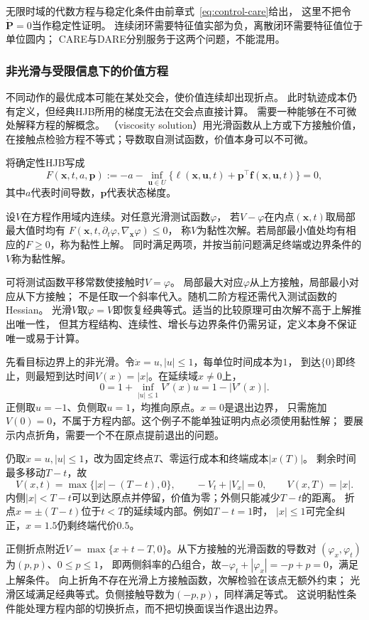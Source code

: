 无限时域的代数方程与稳定化条件由前章式~\eqref{eq:control-care}给出，
这里不把令$\dot{\bm P}=0$当作稳定性证明。
连续闭环需要特征值实部为负，离散闭环需要特征值位于单位圆内；
CARE与DARE分别服务于这两个问题，不能混用。

\subsubsection{非光滑与受限信息下的价值方程}

不同动作的最优成本可能在某处交会，使价值连续却出现折点。
此时轨迹成本仍有定义，但经典HJB所用的梯度无法在交会点直接计算。
需要一种能够在不可微处解释方程的解概念。
（viscosity solution）用光滑函数从上方或下方接触价值，
在接触点检验方程不等式；导数取自测试函数，价值本身可以不可微。

将确定性HJB写成
\[
  F(\bm x,t,a,\bm p)
  :=-a-\inf_{\bm u\in U}
      \{\ell(\bm x,\bm u,t)+\bm p^\top\bm f(\bm x,\bm u,t)\}=0,
\]
其中$a$代表时间导数，$\bm p$代表状态梯度。
\begin{definition}[连续价值函数的黏性解]
\label{def:control-viscosity-solution}
设$V$在方程作用域内连续。对任意光滑测试函数$\varphi$，
若$V-\varphi$在内点$(\bm x,t)$取局部最大值时均有
$F(\bm x,t,\partial_t\varphi,\nabla_{\bm x}\varphi)\leq0$，
称$V$为黏性次解。若局部最小值处均有相应的$F\geq0$，称为黏性上解。
同时满足两项，并按当前问题满足终端或边界条件的$V$称为黏性解。
\end{definition}
可将测试函数平移常数使接触时$V=\varphi$。
局部最大对应$\varphi$从上方接触，局部最小对应从下方接触；
不是任取一个斜率代入。随机二阶方程还需代入测试函数的Hessian。
光滑$V$取$\varphi=V$即恢复经典等式。适当的比较原理可由次解不高于上解推出唯一性，
但其方程结构、连续性、增长与边界条件仍需另证，定义本身不保证唯一或易于计算。

先看目标边界上的非光滑。令$\dot x=u,|u|\leq1$，每单位时间成本为$1$，
到达$\{0\}$即终止，则最短到达时间$V(x)=|x|$。在延续域$x\neq0$上，
\[
  0=1+\inf_{|u|\leq1}V'(x)u=1-|V'(x)|.
\]
正侧取$u=-1$、负侧取$u=1$，均推向原点。$x=0$是退出边界，
只需施加$V(0)=0$，不属于方程内部。这个例子不能单独证明内点必须使用黏性解；
要展示内点折角，需要一个不在原点提前退出的问题。

\begin{example}[延续域内部的价值折点]
\label{ex:control-viscosity-interior-kink}
仍取$\dot x=u,|u|\leq1$，改为固定终点$T$、零运行成本和终端成本$|x(T)|$。
剩余时间最多移动$T-t$，故
\[
  V(x,t)=\max\{|x|-(T-t),0\},\qquad
  -V_t+|V_x|=0,\qquad V(x,T)=|x|.
\]
内侧$|x|<T-t$可以到达原点并停留，价值为零；外侧只能减少$T-t$的距离。
折点$x=\pm(T-t)$位于$t<T$的延续域内部。例如$T-t=1$时，
$|x|\leq1$可完全纠正，$x=1.5$仍剩终端代价$0.5$。

正侧折点附近$V=\max\{x+t-T,0\}$。从下方接触的光滑函数的导数对
$(\varphi_x,\varphi_t)$为$(p,p)$、$0\leq p\leq1$，
即两侧斜率的凸组合，故$-\varphi_t+|\varphi_x|=-p+p=0$，满足上解条件。
向上折角不存在光滑上方接触函数，次解检验在该点无额外约束；
光滑区域满足经典等式。负侧接触导数为$(-p,p)$，同样满足等式。
这说明黏性条件能处理方程内部的切换折点，而不把切换面误当作退出边界。
\end{example}

